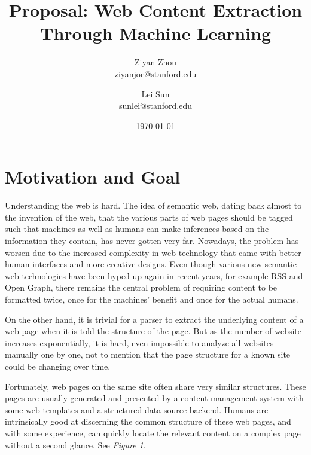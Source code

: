 \documentclass[a4paper,10pt]{article}
\title{Proposal: Web Content Extraction Through Machine Learning}
\author{
    Ziyan Zhou \\
    ziyanjoe@stanford.edu
    \and
    Lei Sun \\
    sunlei@stanford.edu
}
\date{\today}
\begin{document}
\maketitle

\section{Motivation and Goal}

Understanding the web is hard. The idea of semantic web, dating back almost to the invention of the web, that the various parts of web pages should be tagged such that machines as well as humans can make inferences based on the information they contain, has never gotten very far. Nowadays, the problem has worsen due to the increased complexity in web technology that came with better human interfaces and more creative designs. Even though various new semantic web technologies have been hyped up again in recent years, for example RSS and Open Graph, there remains the central problem of requiring content to be formatted twice, once for the machines’ benefit and once for the actual humans.

On the other hand, it is trivial for a parser to extract the underlying content of a web page when it is told the structure of the page. But as the number of website increases exponentially, it is hard, even impossible to analyze all websites manually one by one, not to mention that the page structure for a known site could be changing over time.

Fortunately, web pages on the same site often share very similar structures. These pages are usually generated and presented by a content management system with some web templates and a structured data source backend. Humans are intrinsically good at discerning the common structure of these web pages, and with some experience, can quickly locate the relevant content on a complex page without a second glance. See \emph{Figure 1}.
\end{document}
